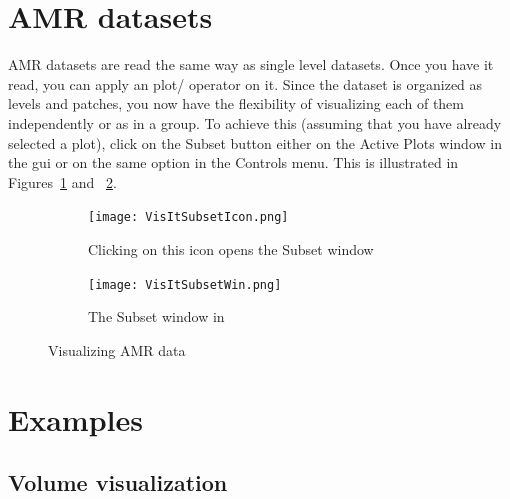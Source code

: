 \section{AMR datasets}
AMR datasets are read the same way as single level datasets. Once you
have it read, you can apply an plot/ operator on it. Since the dataset
is organized as levels and patches, you now have the flexibility of
visualizing each of them independently or as in a group. To achieve
this (assuming that you have already selected a plot), click on the
Subset button either on the Active Plots window in the gui or on the
same option in the Controls menu. This is illustrated in
Figures~\ref{VisItSubsetIcon} and ~\ref{VisItSubsetWin}.
\begin{figure}
  \centering
  \begin{subfigure}[b]{0.4\textwidth}
    \centering
    \texttt{[image: VisItSubsetIcon.png]}
    \caption{Clicking on this icon opens the Subset window}
    \label{VisItSubsetIcon}
  \end{subfigure}
  \begin{subfigure}[b]{0.4\textwidth}
    \centering
    \texttt{[image: VisItSubsetWin.png]}
    \caption{The Subset window in \Visit}
    \label{VisItSubsetWin}
  \end{subfigure}
  \caption{Visualizing AMR data}
  \label{ucf:fig3}
\end{figure}


\section{Examples}

\subsection{Volume visualization}

